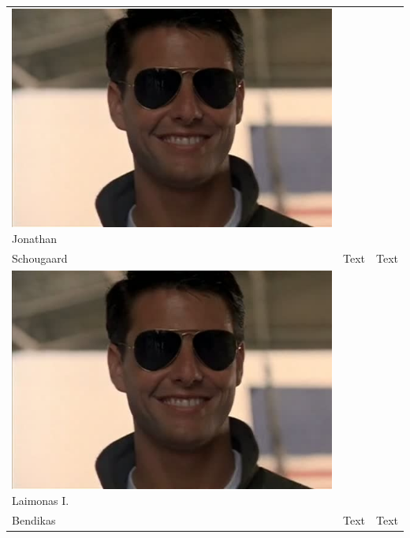 \begin{tabular}[c]{|p{3cm}| p{5cm} | p{6cm}|}
	\phantom{Test}
	\includegraphics[scale=0.54]{Introduction/TeamPictures/TomC} \newline
	Jonathan\\Schougaard
	& Text & Text\\\hline
	
	\phantom{Test}
	\includegraphics[scale=0.54]{Introduction/TeamPictures/TomC} \newline
	Laimonas I.\\Bendikas
	& Text & Text\\\hline
	

\end{tabular}
